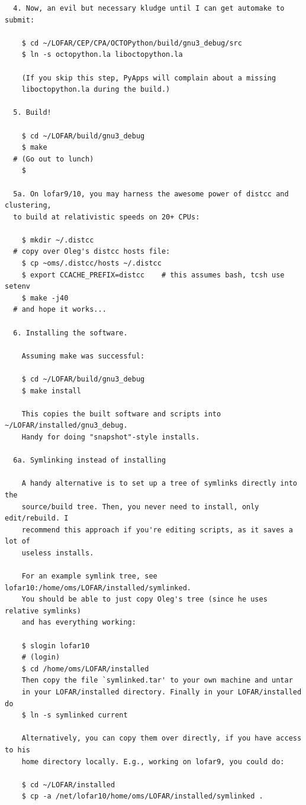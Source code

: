 \documentclass[10pt]{article}
\begin{document}
\begin{verbatim}
  4. Now, an evil but necessary kludge until I can get automake to submit:

    $ cd ~/LOFAR/CEP/CPA/OCTOPython/build/gnu3_debug/src
    $ ln -s octopython.la liboctopython.la

    (If you skip this step, PyApps will complain about a missing 
    liboctopython.la during the build.)

  5. Build!

    $ cd ~/LOFAR/build/gnu3_debug
    $ make 
  # (Go out to lunch)
    $

  5a. On lofar9/10, you may harness the awesome power of distcc and clustering, 
  to build at relativistic speeds on 20+ CPUs:

    $ mkdir ~/.distcc
  # copy over Oleg's distcc hosts file:
    $ cp ~oms/.distcc/hosts ~/.distcc
    $ export CCACHE_PREFIX=distcc    # this assumes bash, tcsh use setenv
    $ make -j40 
  # and hope it works...

  6. Installing the software.

    Assuming make was successful:

    $ cd ~/LOFAR/build/gnu3_debug
    $ make install

    This copies the built software and scripts into ~/LOFAR/installed/gnu3_debug.
    Handy for doing "snapshot"-style installs. 

  6a. Symlinking instead of installing

    A handy alternative is to set up a tree of symlinks directly into the
    source/build tree. Then, you never need to install, only edit/rebuild. I 
    recommend this approach if you're editing scripts, as it saves a lot of
    useless installs. 

    For an example symlink tree, see lofar10:/home/oms/LOFAR/installed/symlinked.
    You should be able to just copy Oleg's tree (since he uses relative symlinks) 
    and has everything working:

    $ slogin lofar10
    # (login)
    $ cd /home/oms/LOFAR/installed
    Then copy the file `symlinked.tar' to your own machine and untar
    in your LOFAR/installed directory. Finally in your LOFAR/installed do
    $ ln -s symlinked current

    Alternatively, you can copy them over directly, if you have access to his
    home directory locally. E.g., working on lofar9, you could do:

    $ cd ~/LOFAR/installed
    $ cp -a /net/lofar10/home/oms/LOFAR/installed/symlinked .


\end{verbatim}
\end{document}
